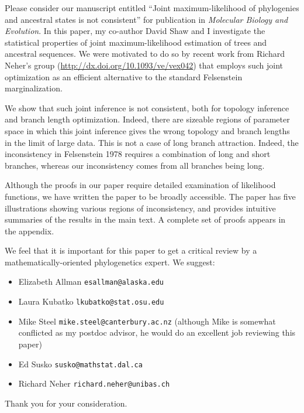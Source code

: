 \documentclass[letterpaper,10pt]{article}
\begin{document}
Please consider our manuscript entitled ``Joint maximum-likelihood of phylogenies and ancestral states is not consistent'' for publication in \textit{Molecular Biology and Evolution}.
In this paper, my co-author David Shaw and I investigate the statistical properties of joint maximum-likelihood estimation of trees and ancestral sequences.
We were motivated to do so by recent work from Richard Neher's group (\url{http://dx.doi.org/10.1093/ve/vex042}) that employs such joint optimization as an efficient alternative to the standard Felsenstein marginalization.

We show that such joint inference is not consistent, both for topology inference and branch length optimization.
Indeed, there are sizeable regions of parameter space in which this joint inference gives the wrong topology and branch lengths in the limit of large data.
This is not a case of long branch attraction.
Indeed, the inconsistency in Felsenstein 1978 requires a combination of long and short branches, whereas our inconsistency comes from all branches being long.

Although the proofs in our paper require detailed examination of likelihood functions, we have written the paper to be broadly accessible.
The paper has five illustrations showing various regions of inconsistency, and provides intuitive summaries of the results in the main text.
A complete set of proofs appears in the appendix.

We feel that it is important for this paper to get a critical review by a mathematically-oriented phylogenetics expert.
We suggest:
\begin{itemize}
\setlength\itemsep{1.4pt}
\item Elizabeth Allman \texttt{esallman@alaska.edu}
\item Laura Kubatko \texttt{lkubatko@stat.osu.edu}
\item Mike Steel \texttt{mike.steel@canterbury.ac.nz} (although Mike is somewhat conflicted as my postdoc advisor, he would do an excellent job reviewing this paper)
\item Ed Susko \texttt{susko@mathstat.dal.ca}
\item Richard Neher \texttt{richard.neher@unibas.ch}
\end{itemize}

Thank you for your consideration.
\end{document}
